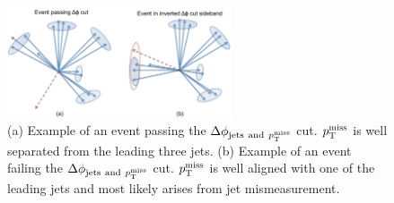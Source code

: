 \begin{figure}[htbp]
\begin{center}
\includegraphics[width=0.59\textwidth]{sections/mc4/Backgrounds/QCD/figures/84sb/DPhiEventVsFlipDPhiEvent.pdf}
\end{center}
\caption{(a) Example of an event passing the 
$\Delta\phi_{\mathrm{jets~and}~p^{\rm miss}_{\rm T}}$ cut. $p^{\rm miss}_{\rm T}$ is well separated from the 
leading three jets. (b) Example of an event failing the 
$\Delta\phi_{\mathrm{jets~and}~p^{\rm miss}_{\rm T}}$ cut. $p^{\rm miss}_{\rm T}$ is well aligned with one of the 
leading jets and most likely arises from jet mismeasurement.}
\label{fig:deltaPhi}
\end{figure}

